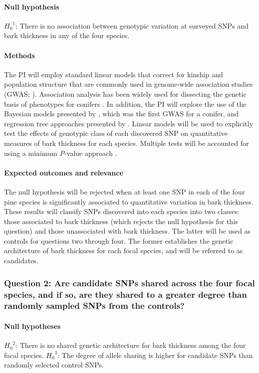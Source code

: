 \paragraph{Null hypothesis} ${H_0}^1$: There is no association between genotypic variation at surveyed SNPs and bark thickness 
in any of the four species.

\paragraph{Methods} The PI will employ standard linear models that correct for kinship and population structure that are 
commonly used in genome-wide association studies (GWAS; \citet{Yu:2006ij}). Association analysis has been widely 
used for dissecting the genetic basis of phenotypes for conifers \citep{Neale:2011jh, Ingvarsson:2011fg}. 
In addition, the PI will explore the use of the Bayesian models presented by \citet{Parchman:2012ca}, which 
was the first GWAS for a conifer, and regression tree approaches presented by \citet{Holliday:2012fz}. 
Linear models will be used to explicitly test the effects of genotypic class of each discovered SNP on quantitative 
measures of bark thickness for each species.  Multiple tests will be accounted for using a minimum \emph{P}-value approach 
\citep{Conneely:2007ga}.

\paragraph{Expected outcomes and relevance} The null hypothesis will be rejected when at least one SNP in each 
of the four pine species is significantly associated to quantitative variation in bark thickness. These results will classify 
SNPs discovered into each species into two classes: those associated to bark thickness 
(which rejects the null hypothesis for this question) and those unassociated with 
bark thickness. The latter will be used as controls for questions two through four. The former establishes the 
genetic architecture of bark thickness for each focal species, and will be referred to as candidates.

\subsubsection*{Question 2: Are candidate SNPs shared across the four focal species, and if so, are they shared to a 
greater degree than randomly sampled SNPs from the controls?}

\paragraph{Null hypotheses}  ${H_0}^2$: There is no shared genetic architecture for bark thickness among 
the four focal species. ${H_0}^3$: The degree of allele sharing is higher for candidate SNPs than randomly 
selected control SNPs.

